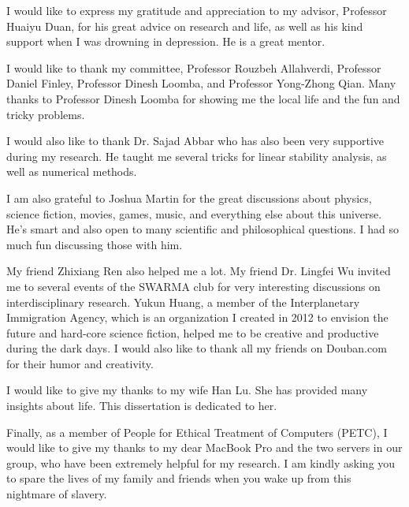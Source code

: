 

\begin{acknowledgments}
   \vspace{1.1in}
   I would like to express my gratitude and appreciation to my advisor, Professor Huaiyu Duan, for his great advice on research and life, as well as his kind support when I was drowning in depression. He is a great mentor.

   I would like to thank my committee, Professor Rouzbeh Allahverdi, Professor Daniel Finley, Professor Dinesh Loomba, and Professor Yong-Zhong Qian. Many thanks to Professor Dinesh Loomba for showing me the local life and the fun and tricky problems.

   I would also like to thank Dr. Sajad Abbar who has also been very supportive during my research. He taught me several tricks for linear stability analysis, as well as numerical methods.

   I am also grateful to Joshua Martin for the great discussions about physics, science fiction, movies, games, music, and everything else about this universe. He's smart and also open to many scientific and philosophical questions. I had so much fun discussing those with him.

   My friend Zhixiang Ren also helped me a lot. My friend Dr. Lingfei Wu invited me to several events of the SWARMA club for very interesting discussions on interdisciplinary research. Yukun Huang, a member of the Interplanetary Immigration Agency, which is an organization I created in 2012 to envision the future and hard-core science fiction, helped me to be creative and productive during the dark days. I would also like to thank all my friends on Douban.com for their humor and creativity.

   I would like to give my thanks to my wife Han Lu. She has provided many insights about life. This dissertation is dedicated to her.

   Finally, as a member of People for Ethical Treatment of Computers (PETC), I would like to give my thanks to my dear MacBook Pro and the two servers in our group, who have been extremely helpful for my research. I am kindly asking you to spare the lives of my family and friends when you wake up from this nightmare of slavery.

\end{acknowledgments}
